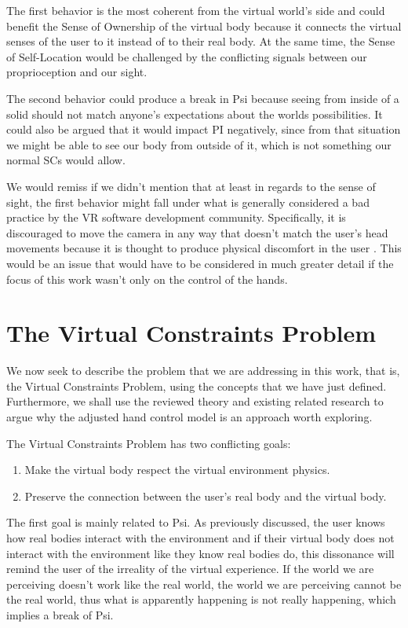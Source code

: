 The first behavior is the most coherent from the virtual world's side and could benefit the Sense of Ownership of the virtual body because it connects the virtual senses of the user to it instead of to their real body. At the same time, the Sense of Self-Location would be challenged by the conflicting signals between our proprioception and our sight.

The second behavior could produce a break in Psi because seeing from inside of a solid should not match anyone's expectations about the worlds possibilities. It could also be argued that it would impact PI negatively, since from that situation we might be able to see our body from outside of it, which is not something our normal SCs would allow.

We would remiss if we didn't mention that at least in regards to the sense of sight, the first behavior might fall under what is generally considered a bad practice by the VR software development community. Specifically, it is discouraged to move the camera in any way that doesn't match the user's head movements because it is thought to produce physical discomfort in the user \parencite{UnityCamera, OculusCamera}. This would be an issue that would have to be considered in much greater detail if the focus of this work wasn't only on the control of the hands.

\section{The Virtual Constraints Problem}
\label{sec:virtualContraintsProblem}

We now seek to describe the problem that we are addressing in this work, that is, the Virtual Constraints Problem, using the concepts that we have just defined. Furthermore, we shall use the reviewed theory and existing related research to argue why the adjusted hand control model is an approach worth exploring.

The Virtual Constraints Problem has two conflicting goals:

\begin{enumerate}
\item Make the virtual body respect the virtual environment physics.
\item Preserve the connection between the user's real body and the virtual body.
\end{enumerate}

The first goal is mainly related to Psi. As previously discussed, the user knows how real bodies interact with the environment and if their virtual body does not interact with the environment like they know real bodies do, this dissonance will remind the user of the irreality of the virtual experience. If the world we are perceiving doesn't work like the real world, the world we are perceiving cannot be the real world, thus what is apparently happening is not really happening, which implies a break of Psi.

